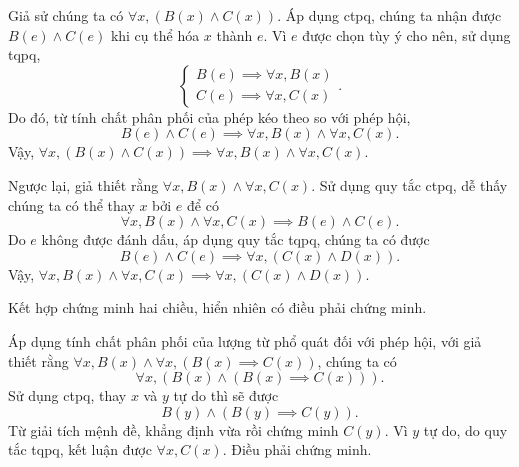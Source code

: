 \stepSubexercise Giả sử chúng ta có $\forall x, (B(x) \land C(x))$. Áp dụng ctpq, chúng ta nhận được $B(e) \land C(e)$ khi cụ thể hóa $x$ thành $e$. Vì $e$ được chọn tùy ý cho nên, sử dụng tqpq,
\begin{equation*}
   \begin{cases}
      B(e) \implies \forall x, B(x) \\
      C(e) \implies \forall x, C(x)
   \end{cases}.
\end{equation*}
Do đó, từ tính chất phân phối của phép kéo theo so với phép hội, \begin{equation*}
   B(e) \land C(e) \implies \forall x, B(x) \land \forall x, C(x).
\end{equation*}
Vậy, $\forall x, (B(x) \land C(x)) \implies \forall x, B(x) \land \forall x, C(x)$.

Ngược lại, giả thiết rằng $\forall x, B(x) \land \forall x, C(x)$. Sử dụng quy tắc ctpq, dễ thấy chúng ta có thể thay $x$ bởi $e$ để có 
\begin{equation*}
   \forall x, B(x) \land \forall x, C(x) \implies B(e) \land C(e).
\end{equation*}
Do $e$ không được đánh dấu, áp dụng quy tắc tqpq, chúng ta có được \begin{equation*}
   B(e) \land C(e) \implies \forall x, (C(x) \land D(x)). 
\end{equation*}
Vậy, $\forall x, B(x) \land \forall x, C(x) \implies \forall x, (C(x) \land D(x))$.

Kết hợp chứng minh hai chiều, hiển nhiên có điều phải chứng minh.

\stepSubexercise Áp dụng tính chất phân phối của lượng từ phổ quát đối với phép hội, với giả thiết rằng $\forall x, B(x) \land \forall x, (B(x) \implies C(x))$, chúng ta có 
\begin{equation*}
   \forall x, (B(x) \land (B(x) \implies C(x))).
\end{equation*}
Sử dụng ctpq, thay $x$ và $y$ tự do thì sẽ được $$
   B(y) \land (B(y) \implies C(y)).
$$
Từ giải tích mệnh đề, khẳng định vừa rồi chứng minh $C(y)$. Vì $y$ tự do, do quy tắc tqpq, kết luận được $\forall x, C(x)$. Điều phải chứng minh.

